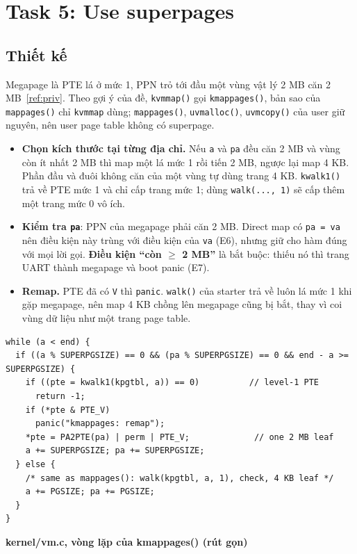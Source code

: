 \documentclass[10pt,a4paper]{article}
\newcommand{\srcname}[1]{{\small\bfseries\color{hcmus}#1}\par\vspace{-2pt}}
\newcommand{\cc}[1]{\texttt{#1}}
\begin{document}
\section{Task 5: Use superpages}\label{sec:task5}

\subsection{Thiết kế}
Megapage là PTE lá ở mức 1, PPN trỏ tới đầu một vùng vật lý 2 MB căn 2 MB~\ref{ref:priv}. Theo gợi ý của đề, \cc{kvmmap()} gọi \cc{kmappages()}, bản sao của \cc{mappages()} chỉ \cc{kvmmap} dùng; \cc{mappages()}, \cc{uvmalloc()}, \cc{uvmcopy()} của user giữ nguyên, nên user page table không có superpage.
\begin{itemize}
  \item \textbf{Chọn kích thước tại từng địa chỉ.} Nếu \cc{a} và \cc{pa} đều căn 2 MB và vùng còn ít nhất 2 MB thì map một lá mức 1 rồi tiến 2 MB, ngược lại map 4 KB. Phần đầu và đuôi không căn của một vùng tự dùng trang 4 KB. \cc{kwalk1()} trả về PTE mức 1 và chỉ cấp trang mức 1; dùng \cc{walk(..., 1)} sẽ cấp thêm một trang mức 0 vô ích.
  \item \textbf{Kiểm tra \cc{pa}}: PPN của megapage phải căn 2 MB. Direct map có \cc{pa = va} nên điều kiện này trùng với điều kiện của \cc{va} (E6), nhưng giữ cho hàm đúng với mọi lời gọi. \textbf{Điều kiện ``còn $\ge$ 2 MB''} là bắt buộc: thiếu nó thì trang UART thành megapage và boot panic (E7).
  \item \textbf{Remap.} PTE đã có \cc{V} thì \cc{panic}. \cc{walk()} của starter trả về luôn lá mức 1 khi gặp megapage, nên map 4 KB chồng lên megapage cũng bị bắt, thay vì coi vùng dữ liệu như một trang page table.
\end{itemize}

\begin{lstlisting}
while (a < end) {
  if ((a % SUPERPGSIZE) == 0 && (pa % SUPERPGSIZE) == 0 && end - a >= SUPERPGSIZE) {
    if ((pte = kwalk1(kpgtbl, a)) == 0)          // level-1 PTE
      return -1;
    if (*pte & PTE_V)
      panic("kmappages: remap");
    *pte = PA2PTE(pa) | perm | PTE_V;             // one 2 MB leaf
    a += SUPERPGSIZE; pa += SUPERPGSIZE;
  } else {
    /* same as mappages(): walk(kpgtbl, a, 1), check, 4 KB leaf */
    a += PGSIZE; pa += PGSIZE;
  }
}
\end{lstlisting}
\vspace{-2pt}
\srcname{kernel/vm.c, vòng lặp của kmappages() (rút gọn)}
\end{document}
